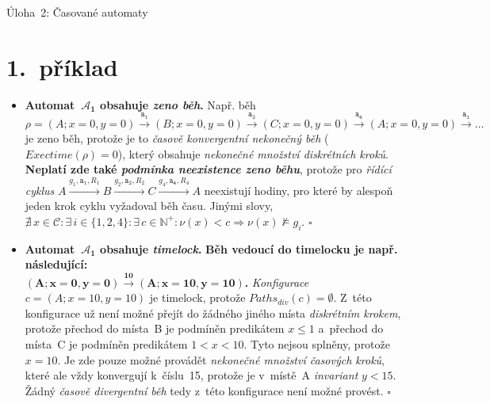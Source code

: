 \documentclass[a4paper, 11pt]{scrartcl}
\newcommand{\TASK}{2: Časované automaty}
\newcommand*{\QEDB}{\hfill\ensuremath{\square}}
\begin{document}
    \begin{center}
        {\Large Úloha~\TASK}
    \end{center}


    \section*{1.~příklad}

    \begin{itemize}
        \item
            \textbf{Automat~$ \boldsymbol{\mathcal{A}_1} $ obsahuje \emph{zeno
            běh}.} Např. běh $ \rho = (A; x = 0, y = 0) \xrightarrow{\mathtt{
            a_1}} (B; x = 0, y = 0) \xrightarrow{\mathtt{a_2}} (C; x = 0, y = 0)
            \xrightarrow{\mathtt{a_4}} (A; x = 0, y = 0) \xrightarrow{\mathtt{
            a_1}} \dots $ je zeno běh, protože je to \emph{časově konvergentní
            nekonečný běh} ($ Exectime(\rho) = 0 $), který obsahuje \emph{
            nekonečné množství diskrétních kroků}. \textbf{Neplatí zde také
            \emph{podmínka neexistence zeno běhu}}, protože pro \emph{řídící
            cyklus} $ A \xrightarrow{g_1, \mathtt{a_1}, R_1} B \xrightarrow{g_2,
            \mathtt{a_2}, R_2} C \xrightarrow{g_4, \mathtt{a_4}, R_4} A $
            neexistují hodiny, pro které by alespoň jeden krok cyklu vyžadoval
            běh času. Jinými slovy, $ \nexists\,x \in \mathcal{C}: \exists\,i
            \in \{1, 2, 4\}: \exists\,c \in \mathbb{N}^+: \nu(x) < c
            \Rightarrow \nu(x) \not\models g_i $. \QEDB

        \item
            \textbf{Automat~$ \boldsymbol{\mathcal{A}_1} $ obsahuje
            \emph{timelock}.} \textbf{Běh vedoucí do timelocku je např.
            následující: \\
            $ \boldsymbol{(A; x = 0, y = 0) \xrightarrow{10} (A; x = 10, y =
            10)} $.} \emph{Konfigurace} $ c = (A; x = 10, y = 10) $ je
            timelock, protože $ Paths_{div}(c) = \emptyset $. Z~této
            konfigurace už není možné přejít do žádného jiného místa
            \emph{diskrétním krokem}, protože přechod do místa~B je podmíněn
            predikátem $ x \leq 1 $ a~přechod do místa~C je podmíněn predikátem
            $ 1 < x < 10 $. Tyto nejsou splněny, protože $ x = 10 $. Je zde
            pouze možné provádět \emph{nekonečné množství časových kroků},
            které ale vždy konvergují k~číslu~15, protože je v~místě~A
            \emph{invariant} $ y < 15 $. Žádný \emph{časově divergentní běh}
            tedy z~této konfigurace není možné provést. \QEDB
    \end{itemize}
\end{document}
